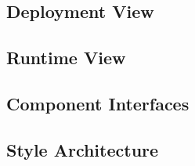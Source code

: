 \subsection{Deployment View}

\subsection{Runtime View}

\subsection{Component Interfaces}

\subsection{Style Architecture}

